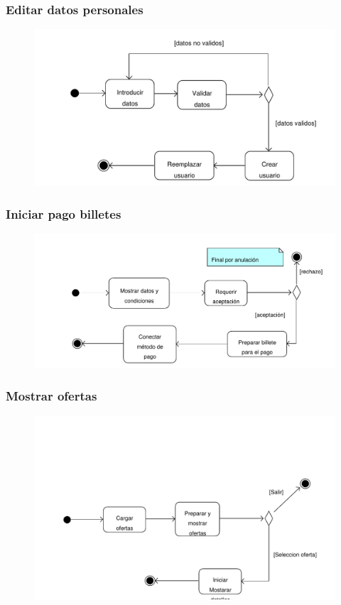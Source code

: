 \documentclass[11pt, a4paper, twoside, titlepage]{article}
\begin{document}
			\subsubsection{Editar datos personales}
				\begin{figure}[H]\centering
					\includegraphics[scale=.86]{diagramas/da_editardatospersonales.pdf}
				\end{figure}


			\subsubsection{Iniciar pago billetes}
				\begin{figure}[H]\centering
					\includegraphics[scale=.76]{diagramas/da_iniciarpagobilletes.pdf}
				\end{figure}

			\subsubsection{Mostrar ofertas}
				\begin{figure}[H]\centering
				\includegraphics[scale=.72]{diagramas/da_mostrarofertas.pdf}
				\end{figure}
\end{document}
